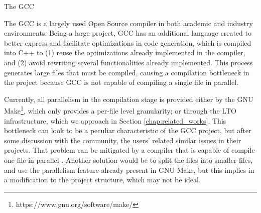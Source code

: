\begin{section}{The GCC}


The GCC is a largely used Open Source compiler in both academic and industry
environments. Being a large project, GCC has an additional language created to
better express and facilitate optimizations in code generation, which is
compiled into C++ to (1) reuse the optimizations already implemented in the
compiler, and (2) avoid rewriting several functionalities already implemented.
This process generates large files that must be compiled, causing a compilation
bottleneck in the project because GCC is not capable of compiling a single file
in parallel.

Currently, all parallelism in the compilation stage is provided either by the
GNU Make\footnote{https://www.gnu.org/software/make/}, which only provides a
per-file level granularity; or through the LTO infrastructure, which we
approach in Section \ref{chap:related_works}. This bottleneck can look to be a
peculiar characteristic of the GCC project, but after some discussion with the
community, the users' related similar issues in their projects. That problem
can be mitigated by a compiler that is capable of compile one file in parallel
\citep{mailgcc}.  Another solution would be to split the files into smaller
files, and use the parallelism feature already present in GNU Make, but this
implies in a modification to the project structure, which may not be ideal.




\end{section}
